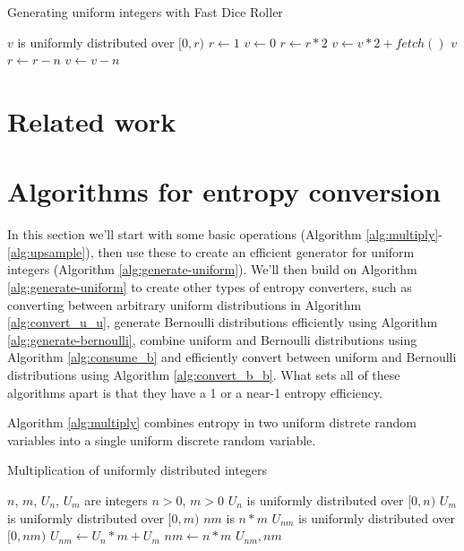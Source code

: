 \documentclass[12pt]{article}
\begin{document}
\begin{algorithm}
\caption{Generating uniform integers with Fast Dice Roller}
    \label{alg:fast-dice-roller}
\begin{algorithmic}[1]
    \Ensure $v$ is uniformly distributed over $[0,r)$
    \State $r \gets 1$
    \State $v \gets 0$
    \Loop
            \State $r \gets r * 2$
            \State $v \gets v * 2 + fetch()$
        \EndWhile
            \State \Return $v$
        \EndIf
        \State $r \gets r-n$
        \State $v \gets v-n$
    \EndLoop
\EndProcedure
\end{algorithmic}
\end{algorithm}


\section{Related work}


\section{Algorithms for entropy conversion}

In this section we'll start with some basic operations (Algorithm \ref{alg:multiply}-\ref{alg:upsample}), then use these to create an efficient generator for uniform integers (Algorithm \ref{alg:generate-uniform}). We'll then build on Algorithm \ref{alg:generate-uniform} to create other types of entropy converters, such as converting between arbitrary uniform distributions in Algorithm \ref{alg:convert_u_u}, generate Bernoulli distributions efficiently using Algorithm \ref{alg:generate-bernoulli}, combine uniform and Bernoulli distributions using Algorithm \ref{alg:consume_b} and efficiently convert between uniform and Bernoulli distributions using Algorithm \ref{alg:convert_b_b}. What sets all of these algorithms apart is that they have a 1 or a near-1 entropy efficiency.

Algorithm \ref{alg:multiply} combines entropy in two uniform distrete random variables into a single uniform discrete random variable.

\begin{algorithm}
\caption{Multiplication of uniformly distributed integers}
\label{alg:multiply}
\begin{algorithmic}[1]
    \Require $n$, $m$, $U_n$, $U_m$ are integers
    \Require $n>0$, $m>0$
    \Require $U_n$ is uniformly distributed over $[0,n)$
    \Require $U_m$ is uniformly distributed over $[0,m)$
    \Ensure $nm$ is $n * m$
    \Ensure $U_{nm}$ is uniformly distributed over $[0,nm)$
  \State $U_{nm} \gets U_n * m + U_m$
  \State $nm \gets n * m$
  \State \Return $U_{nm}, nm$
\EndProcedure
\end{algorithmic}
\end{algorithm}
\end{document}
